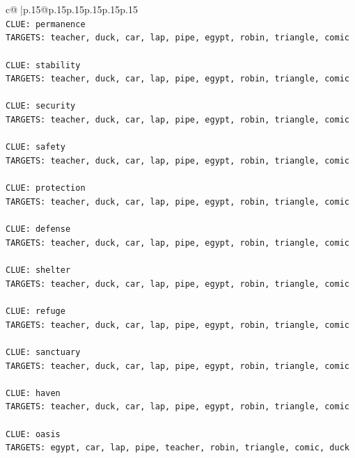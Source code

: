 \documentclass{article}
\begin{document}
{\begin{supertabular}{c@{$\;$}|p{.15\linewidth}@{}p{.15\linewidth}p{.15\linewidth}p{.15\linewidth}p{.15\linewidth}p{.15\linewidth}}
{{{\\ 
\texttt{CLUE: permanence} \\
\texttt{TARGETS: teacher, duck, car, lap, pipe, egypt, robin, triangle, comic} \\
\\ 
\texttt{CLUE: stability} \\
\texttt{TARGETS: teacher, duck, car, lap, pipe, egypt, robin, triangle, comic} \\
\\ 
\texttt{CLUE: security} \\
\texttt{TARGETS: teacher, duck, car, lap, pipe, egypt, robin, triangle, comic} \\
\\ 
\texttt{CLUE: safety} \\
\texttt{TARGETS: teacher, duck, car, lap, pipe, egypt, robin, triangle, comic} \\
\\ 
\texttt{CLUE: protection} \\
\texttt{TARGETS: teacher, duck, car, lap, pipe, egypt, robin, triangle, comic} \\
\\ 
\texttt{CLUE: defense} \\
\texttt{TARGETS: teacher, duck, car, lap, pipe, egypt, robin, triangle, comic} \\
\\ 
\texttt{CLUE: shelter} \\
\texttt{TARGETS: teacher, duck, car, lap, pipe, egypt, robin, triangle, comic} \\
\\ 
\texttt{CLUE: refuge} \\
\texttt{TARGETS: teacher, duck, car, lap, pipe, egypt, robin, triangle, comic} \\
\\ 
\texttt{CLUE: sanctuary} \\
\texttt{TARGETS: teacher, duck, car, lap, pipe, egypt, robin, triangle, comic} \\
\\ 
\texttt{CLUE: haven} \\
\texttt{TARGETS: teacher, duck, car, lap, pipe, egypt, robin, triangle, comic} \\
\\ 
\texttt{CLUE: oasis} \\
\texttt{TARGETS: egypt, car, lap, pipe, teacher, robin, triangle, comic, duck} \\
\\ 
}}}
\end{supertabular}}
\end{document}
